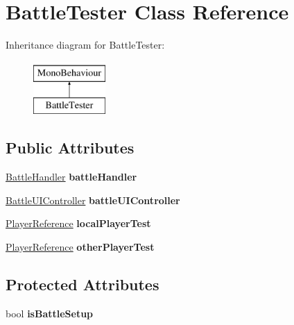 \hypertarget{class_battle_tester}{\section{Battle\-Tester Class Reference}
\label{class_battle_tester}
}
Inheritance diagram for Battle\-Tester\-:\begin{figure}[H]
\begin{center}
\leavevmode
\includegraphics[height=2.000000cm]{class_battle_tester}
\end{center}
\end{figure}
\subsection*{Public Attributes}
\begin{DoxyCompactItemize}
\item 
\hypertarget{class_battle_tester_a87c03ddd5b47eb2881580fa62588660f}{\hyperlink{class_battle_handler}{Battle\-Handler} {\bfseries battle\-Handler}}\label{class_battle_tester_a87c03ddd5b47eb2881580fa62588660f}

\item 
\hypertarget{class_battle_tester_ab0a3a610e839111f2a5d460c9c140a1f}{\hyperlink{class_battle_u_i_controller}{Battle\-U\-I\-Controller} {\bfseries battle\-U\-I\-Controller}}\label{class_battle_tester_ab0a3a610e839111f2a5d460c9c140a1f}

\item 
\hypertarget{class_battle_tester_a59cd1f342f02a381f14cc68d2dccbecd}{\hyperlink{class_player_reference}{Player\-Reference} {\bfseries local\-Player\-Test}}\label{class_battle_tester_a59cd1f342f02a381f14cc68d2dccbecd}

\item 
\hypertarget{class_battle_tester_a7ba7788e6f82c3ac156076241bd4df65}{\hyperlink{class_player_reference}{Player\-Reference} {\bfseries other\-Player\-Test}}\label{class_battle_tester_a7ba7788e6f82c3ac156076241bd4df65}

\end{DoxyCompactItemize}
\subsection*{Protected Attributes}
\begin{DoxyCompactItemize}
\item 
\hypertarget{class_battle_tester_a39cd5d1c4a86ae22eb25d9a6d6674db9}{bool {\bfseries is\-Battle\-Setup}}\label{class_battle_tester_a39cd5d1c4a86ae22eb25d9a6d6674db9}

\end{DoxyCompactItemize}
